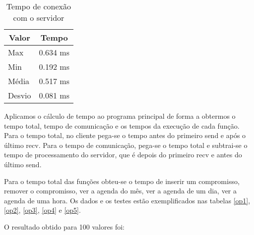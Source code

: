 \documentclass[10pt,a4paper]{article}
\begin{document}
  \begin{table}[h!]
    \begin{center}
        \begin{tabular}{lr}
          \multicolumn{1}{c}{Valor} & \multicolumn{1}{c}{Tempo}\\
          \hline
          Max & 0.634 ms\\
          Min & 0.192 ms\\
          Média & 0.517 ms \\
          Desvio & 0.081 ms
        \end{tabular}
    \end{center}
    \vspace{-5mm}
    \caption{Tempo de conexão com o servidor}        \label{conntime}
  \end{table}

Aplicamos o cálculo de tempo ao programa principal de
  forma a obtermos o tempo total,  tempo de comunicação e os tempos da
  execução de cada função.
  Para o tempo total, no cliente pega-se o tempo antes do primeiro send e após o último recv.
  Para o tempo de comunicação, pega-se o tempo total e subtrai-se o tempo de processamento do servidor,
  que é depois do primeiro recv e antes do último send.

  Para o tempo total das funções obteu-se o tempo de inserir um
  compromisso, remover o compromisso, ver a agenda do mês, ver a agenda
  de um dia, ver a agenda de uma hora. Os dados e os testes estão
  exemplificados nas tabelas \ref{op1}, \ref{op2}, \ref{op3},
  \ref{op4} e \ref{op5}.

  O resultado obtido para 100 valores foi:

  \begin{table}[h!]
    \begin{center}

      \hspace{30mm}

    \end{center}
    \vspace{-5mm}
    \caption{Conexão e fechamento de conexão com servidor} \label{op1}
  \end{table}
\end{document}
